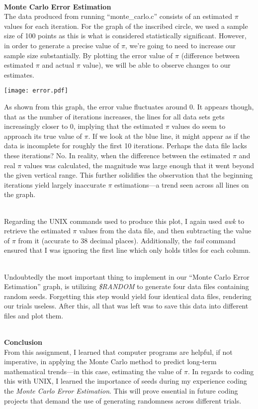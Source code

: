 \documentclass[12pt]{article}
\begin{document}
\large
\textbf{\\Monte Carlo Error Estimation}
\normalsize
\\The data produced from running \enquote{monte\_carlo.c} consists of an estimated $\pi$ values for each iteration. For the graph of the inscribed circle, we used a sample size of 100 points as this is what is considered statistically significant. However, in order to generate a precise value of $\pi$, we're going to need to increase our sample size substantially. By plotting the error value of $\pi$ (difference between estimated $\pi$ and actual $\pi$ value), we will be able to observe changes to our estimates.

\texttt{[image: error.pdf]}

As shown from this graph, the error value fluctuates around 0. It appears though, that as the number of iterations increases, the lines for all data sets gets increasingly closer to 0, implying that the estimated $\pi$ values do seem to approach its true value of $\pi$. If we look at the blue line, it might appear as if the data is incomplete for roughly the first 10 iterations. Perhaps the data file lacks these iterations? No. In reality, when the difference between the estimated $\pi$ and real $\pi$ values was calculated, the magnitude was large enough that it went beyond the given vertical range. This further solidifies the observation that the beginning iterations yield largely inaccurate $\pi$ estimations---a trend seen across all lines on the graph.

\textbf{\\}
Regarding the UNIX commands used to produce this plot, I again used \textit{awk} to retrieve the estimated $\pi$ values from the data file, and then subtracting the value of $\pi$ from it (accurate to 38 decimal places). Additionally, the \textit{tail} command ensured that I was ignoring the first line which only holds titles for each column.

\textbf{\\}
Undoubtedly the most important thing to implement in our \enquote{Monte Carlo Error Estimation} graph, is utilizing \textit{\$RANDOM} to generate four data files containing random seeds. Forgetting this step would yield four identical data files, rendering our trials useless. After this, all that was left was to save this data into different files and plot them.

\large
\textbf{\\Conclusion}
\normalsize
\\From this assignment, I learned that computer programs are helpful, if not imperative, in applying the Monte Carlo method to predict long-term mathematical trends---in this case, estimating the value of $\pi$. In regards to coding this with UNIX, I learned the importance of seeds during my experience coding the \textit{Monte Carlo Error Estimation}. This will prove essential in future coding projects that demand the use of generating randomness across different trials.
\end{document}
